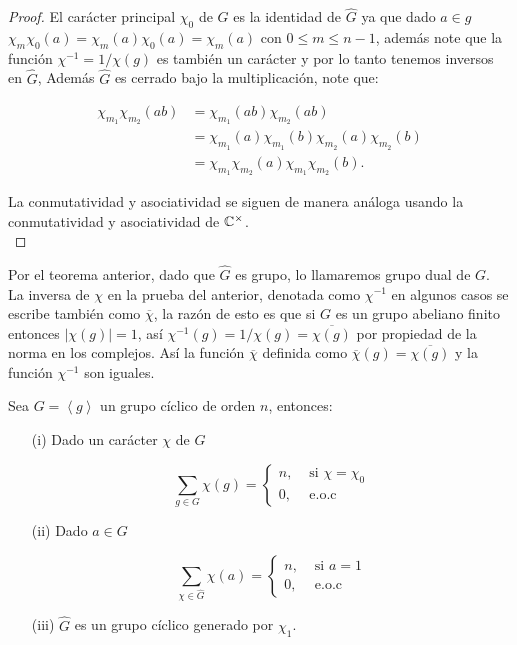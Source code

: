 \begin{proof}
El carácter principal $\chi_0$ de $G$ es la identidad de $\widehat{G}$ ya que dado $a\in g$ $\chi_m\chi_0(a)=\chi_m(a)\chi_0(a)=\chi_m(a)$ con $0\leq m\leq n-1$, además note que la función $\chi^{-1}=1/\chi(g)$ es también un carácter y por lo tanto tenemos inversos en $\widehat{G}$, Además $\widehat{G}$ es cerrado bajo la multiplicación, note que:

\begin{align*}
     \chi_{m_1}\chi_{m_2}(ab)&=\chi_{m_1}(ab)\chi_{m_2}(ab)\\
     &=\chi_{m_1}(a)\chi_{m_1}(b)\chi_{m_2}(a)\chi_{m_2}(b)\\
     &=\chi_{m_1}\chi_{m_2}(a)\chi_{m_1}\chi_{m_2}(b)
      .\end{align*}

    La conmutatividad y asociatividad se siguen de manera análoga usando la conmutatividad y asociatividad de $\mathbb{C}^{\times}$.\\
\end{proof}

\begin{note}
Por el teorema anterior, dado que $\widehat{G}$ es grupo, lo llamaremos grupo dual de $G$.\\


La inversa de $\chi$ en la prueba del anterior, denotada  como $\chi^{-1}$ en algunos casos se escribe también como $\overline{\chi}$, la razón de esto es que si $G$ es un grupo abeliano finito entonces $|\chi(g)|=1$, así $\chi^{-1}(g)=1/\chi(g)=\overline{\chi(g)}$ por propiedad de la norma en los complejos. Así la función $\overline{\chi}$ definida como $\overline{\chi}(g)=\overline{\chi(g)}$ y la función $\chi^{-1}$ son iguales. \cite{pongsriiam2023analytic}
\end{note}

\begin{theorem}
Sea $G=\left\langle g\right\rangle$ un grupo cíclico de orden $n$, entonces:

\begin{itemize}
\item[(i)] Dado un carácter $\chi$ de $G$

$$
\sum_{g \in G} \chi(g)= \begin{cases}n, & \text { si } \chi=\chi_0 \\ 0, & \text { e.o.c }\end{cases}
$$

\item[(ii)] Dado $a \in G$

$$
\sum_{\chi \in \widehat{G}} \chi(a)= \begin{cases}n, & \text { si } a=1 \\ 0, & \text { e.o.c }\end{cases}
$$

\item[(iii)] $\widehat{G}$ es un grupo cíclico generado por $\chi_1$.
\end{itemize}

\end{theorem}


